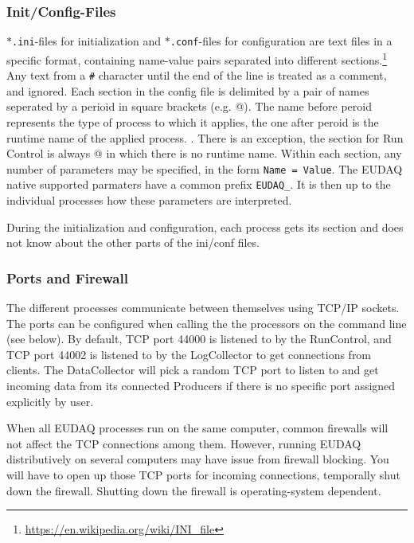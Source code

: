 \subsubsection{Init/Config-Files}\label{sec:ConfigFiles}
\texttt{$\ast$.ini}-files for initialization and \texttt{$\ast$.conf}-files for configuration
are text files in a specific format, containing name-value pairs separated into different sections.\footnote{\url{https://en.wikipedia.org/wiki/INI\_file}}
Any text from a \texttt{\#} character until the end of the line is treated as a comment, and
ignored.  
Each section in the config file is delimited by a pair of names seperated by a perioid in square brackets (e.g. @).
The name before peroid represents the type of process to which it applies, the one after peroid is the runtime name of the applied process.
. There is an exception, the section for Run Control is always \verb@[RunControl]@ in which there is no runtime name. 
Within each section, any number of parameters may be specified,
in the form \mbox{\texttt{Name = Value}}.  The EUDAQ native supported parmaters have a common prefix \texttt{EUDAQ\_}.
It is then up to the individual processes how these parameters are interpreted.

During the initialization and configuration, each process gets its section and does not know about the other parts of the ini/conf files.


\subsubsection{Ports and Firewall}
The different processes communicate between themselves using TCP/IP sockets. The ports can be configured when calling the the processors on the command line (see below). By default, TCP port 44000 is listened to by the RunControl, and TCP port 44002 is listened to by the LogCollector to get connections from clients. The DataCollector will pick a random TCP port to listen to and get incoming data from its connected Producers if there is no specific port assigned explicitly by user.

When all EUDAQ processes run on the same computer, common firewalls will not affect the TCP connections among them. However, running EUDAQ distributively on several computers may have issue from firewall blocking. You will have to open up those TCP ports for incoming connections, temporally shut down the firewall. Shutting down the firewall is operating-system dependent.\\

